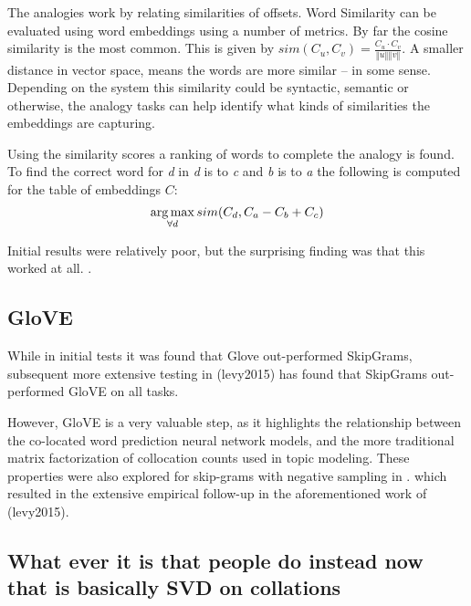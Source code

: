 \documentclass[parskip]{komatufte}
\begin{document}
The analogies work by relating similarities of offsets.
Word Similarity can be evaluated using word embeddings using a number of metrics.
By far the cosine similarity is the most common.
This is given by $sim(C_u, C_v)=\frac{C_{u}\cdot C_{v}}{\left\Vert u\right\Vert \left\Vert v\right\Vert }$.
A smaller distance in vector space, means the words are more similar -- in some sense.
Depending on the system this similarity could be syntactic, semantic or otherwise, the analogy tasks can help identify what kinds of similarities the embeddings are capturing.

Using the similarity scores a ranking of words to complete the analogy is found.
To find the correct word for \emph{d} in \emph{d} is to \emph{c} and \emph{b} is to \emph{a}
the following is computed for the table of embeddings $C$:
\begin{equation}
\operatorname*{arg\,max}_{\forall d} sim(C_d, C_a-C_b+C_c)
\end{equation}


Initial results were relatively poor, but the surprising finding was that this worked at all. .



\subsection{GloVE}


While in initial tests it was found that Glove out-performed  SkipGrams,
subsequent more extensive testing in \tcite(levy2015) has found that SkipGrams out-performed GloVE on all tasks.

However, GloVE is a very valuable step,
as it highlights the relationship between the co-located word prediction neural network models,
and the more traditional matrix factorization of collocation counts used in topic modeling.
These properties were also explored for skip-grams with negative sampling in .
which resulted in the extensive empirical follow-up in the aforementioned work of \tcite(levy2015).



\subsection{What ever it is that people do instead now that is basically SVD on collations}
\end{document}
